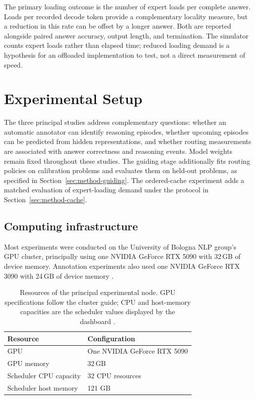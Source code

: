 \documentclass[12pt,a4paper,twoside,openright]{book}
\begin{document}
The primary loading outcome is the number of expert loads per complete
answer. Loads per recorded decode token provide a complementary locality
measure, but a reduction in this rate can be offset by a longer answer.
Both are reported alongside paired answer accuracy, output length, and
termination. The simulator counts expert loads rather than elapsed time;
reduced loading demand is a hypothesis for an offloaded implementation to
test, not a direct measurement of speed.

\chapter{Experimental Setup}
\label{ch:experimental-setup}

The three principal studies address complementary questions: whether an automatic
annotator can identify reasoning episodes, whether upcoming episodes can be
predicted from hidden representations, and whether routing measurements are
associated with answer correctness and reasoning events. Model weights remain
fixed throughout these studies. The guiding stage additionally fits routing
policies on calibration problems and evaluates them on held-out problems,
as specified in Section~\ref{sec:method-guiding}. The ordered-cache
experiment adds a matched evaluation of expert-loading demand under the
protocol in Section~\ref{sec:method-cache}.

\section{Computing infrastructure}
\label{sec:setup-infrastructure}

Most experiments were conducted on the University of Bologna NLP group's
GPU cluster, principally using one NVIDIA GeForce RTX 5090 with 32\,GB of
device memory. Annotation experiments also used one NVIDIA GeForce RTX 3090
with 24\,GB of device memory \cite{unibonlpClusterGuide}.

\begin{table}[!ht]
  \centering
  \small
  \caption{Resources of the principal experimental node. GPU specifications
  follow the cluster guide; CPU and host-memory capacities are the scheduler
  values displayed by the dashboard
  \cite{unibonlpClusterGuide,unibonlpClusterDashboard}.}
  \label{tab:setup-hardware}
  \begin{tabularx}{\textwidth}{@{}lX@{}}
    \toprule
    Resource & Configuration \\
    \midrule
    GPU & One NVIDIA GeForce RTX 5090 \\
    GPU memory & 32\,GB \\
    Scheduler CPU capacity & 32 CPU resources \\
    Scheduler host memory & 121 GB \\
    \bottomrule
  \end{tabularx}
\end{table}
\end{document}
